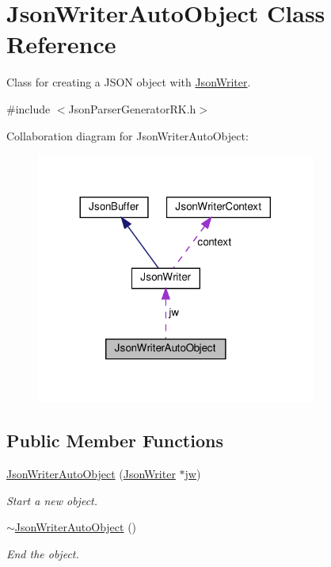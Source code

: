 \hypertarget{class_json_writer_auto_object}{}\section{Json\+Writer\+Auto\+Object Class Reference}
\label{class_json_writer_auto_object}


Class for creating a J\+S\+ON object with \hyperlink{class_json_writer}{Json\+Writer}.  




{\ttfamily \#include $<$Json\+Parser\+Generator\+R\+K.\+h$>$}



Collaboration diagram for Json\+Writer\+Auto\+Object\+:\nopagebreak
\begin{figure}[H]
\begin{center}
\leavevmode
\includegraphics[width=260pt]{class_json_writer_auto_object__coll__graph}
\end{center}
\end{figure}
\subsection*{Public Member Functions}
\begin{DoxyCompactItemize}
\item 
\hyperlink{class_json_writer_auto_object_a92e7cbe4161ff0bd184791e1d666e95f}{Json\+Writer\+Auto\+Object} (\hyperlink{class_json_writer}{Json\+Writer} $\ast$\hyperlink{class_json_writer_auto_object_a4ffea7af57b2ceb87edd5e7ee08aeefb}{jw})
\begin{DoxyCompactList}\small\item\em Start a new object. \end{DoxyCompactList}\item 
\hyperlink{class_json_writer_auto_object_adb79acd280cd69ae5d0d6afea1c187bc}{$\sim$\+Json\+Writer\+Auto\+Object} ()
\begin{DoxyCompactList}\small\item\em End the object. \end{DoxyCompactList}\end{DoxyCompactItemize}

